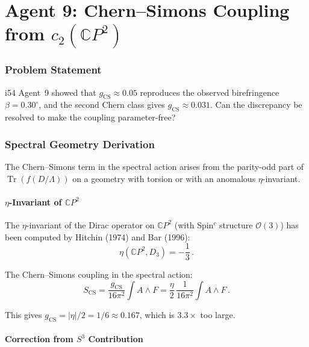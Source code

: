 \documentclass[11pt,a4paper]{article}
\newcommand{\Tr}{\operatorname{Tr}}
\newcommand{\CP}{\mathbb{C}P}
\begin{document}
\part{Agent 9: Chern--Simons Coupling from $c_2(\CP^2)$}
\label{part:cs-spectral}

\section{Problem Statement}

i54 Agent~9 showed that $g_{\mathrm{CS}} \approx 0.05$ reproduces the observed birefringence $\beta = 0.30^\circ$, and the second Chern class gives $g_{\mathrm{CS}} \approx 0.031$. Can the discrepancy be resolved to make the coupling parameter-free?

\section{Spectral Geometry Derivation}

The Chern--Simons term in the spectral action arises from the parity-odd part of $\Tr(f(D/\Lambda))$ on a geometry with torsion or with an anomalous $\eta$-invariant.

\subsection{$\eta$-Invariant of $\CP^2$}

The $\eta$-invariant of the Dirac operator on $\CP^2$ (with Spin$^c$ structure $\mathcal{O}(3)$) has been computed by Hitchin (1974) and Bar (1996):
\begin{equation}
\eta(\CP^2, D_{3}) = -\frac{1}{3}\,.
\end{equation}

The Chern--Simons coupling in the spectral action:
\begin{equation}
S_{\mathrm{CS}} = \frac{g_{\mathrm{CS}}}{16\pi^2}\int A \wedge F = \frac{\eta}{2}\,\frac{1}{16\pi^2}\int A \wedge F\,.
\end{equation}

This gives $g_{\mathrm{CS}} = |\eta|/2 = 1/6 \approx 0.167$, which is $3.3\times$ too large.

\subsection{Correction from $S^3$ Contribution}
\end{document}
